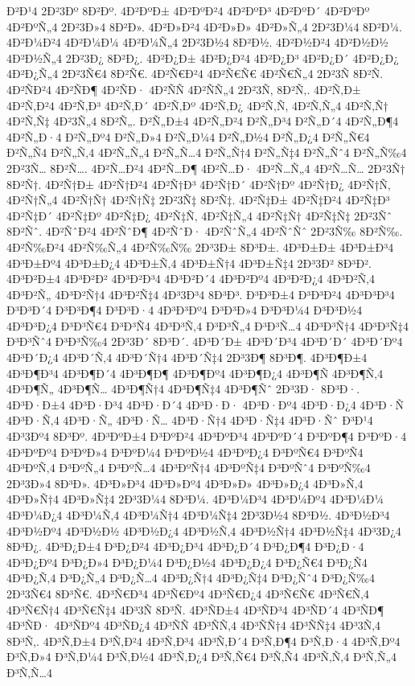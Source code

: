{Ð²Ð¹4
2Ð²3Ðº
8Ð²Ðº.
4Ð²ÐºÐ±
4Ð²ÐºÐ²4
4Ð²ÐºÐ³
4Ð²ÐºÐ´
4Ð²ÐºÐº
4Ð²ÐºÑ„4
2Ð²3Ð»4
8Ð²Ð».
4Ð²Ð»Ð²4
4Ð²Ð»Ð»
4Ð²Ð»Ñ„4
2Ð²3Ð¼4
8Ð²Ð¼.
4Ð²Ð¼Ð²4
4Ð²Ð¼Ð¼
4Ð²Ð¼Ñ„4
2Ð²3Ð½4
8Ð²Ð½.
4Ð²Ð½Ð²4
4Ð²Ð½Ð½
4Ð²Ð½Ñ„4
2Ð²3Ð¿
8Ð²Ð¿.
4Ð²Ð¿Ð±
4Ð²Ð¿Ð²4
4Ð²Ð¿Ð³
4Ð²Ð¿Ð´
4Ð²Ð¿Ð¿
4Ð²Ð¿Ñ„4
2Ð²3Ñ€4
8Ð²Ñ€.
4Ð²Ñ€Ð²4
4Ð²Ñ€Ñ€
4Ð²Ñ€Ñ„4
2Ð²3Ñ
8Ð²Ñ.
4Ð²ÑÐ²4
4Ð²ÑÐ¶
4Ð²ÑÐ·
4Ð²ÑÑ
4Ð²ÑÑ„4
2Ð²3Ñ‚
8Ð²Ñ‚.
4Ð²Ñ‚Ð±
4Ð²Ñ‚Ð²4
4Ð²Ñ‚Ð³
4Ð²Ñ‚Ð´
4Ð²Ñ‚Ðº
4Ð²Ñ‚Ð¿
4Ð²Ñ‚Ñ‚
4Ð²Ñ‚Ñ„4
4Ð²Ñ‚Ñ†
4Ð²Ñ‚Ñ‡
4Ð²3Ñ„4
8Ð²Ñ„.
Ð²Ñ„Ð±4
4Ð²Ñ„Ð²4
Ð²Ñ„Ð³4
Ð²Ñ„Ð´4
4Ð²Ñ„Ð¶4
4Ð²Ñ„Ð·4
Ð²Ñ„Ðº4
Ð²Ñ„Ð»4
Ð²Ñ„Ð¼4
Ð²Ñ„Ð½4
Ð²Ñ„Ð¿4
Ð²Ñ„Ñ€4
Ð²Ñ„Ñ4
Ð²Ñ„Ñ‚4
4Ð²Ñ„Ñ„4
Ð²Ñ„Ñ…4
Ð²Ñ„Ñ†4
Ð²Ñ„Ñ‡4
Ð²Ñ„Ñˆ4
Ð²Ñ„Ñ‰4
2Ð²3Ñ…
8Ð²Ñ….
4Ð²Ñ…Ð²4
4Ð²Ñ…Ð¶
4Ð²Ñ…Ð·
4Ð²Ñ…Ñ„4
4Ð²Ñ…Ñ…
2Ð²3Ñ†
8Ð²Ñ†.
4Ð²Ñ†Ð±
4Ð²Ñ†Ð²4
4Ð²Ñ†Ð³
4Ð²Ñ†Ð´
4Ð²Ñ†Ðº
4Ð²Ñ†Ð¿
4Ð²Ñ†Ñ‚
4Ð²Ñ†Ñ„4
4Ð²Ñ†Ñ†
4Ð²Ñ†Ñ‡
2Ð²3Ñ‡
8Ð²Ñ‡.
4Ð²Ñ‡Ð±
4Ð²Ñ‡Ð²4
4Ð²Ñ‡Ð³
4Ð²Ñ‡Ð´
4Ð²Ñ‡Ðº
4Ð²Ñ‡Ð¿
4Ð²Ñ‡Ñ‚
4Ð²Ñ‡Ñ„4
4Ð²Ñ‡Ñ†
4Ð²Ñ‡Ñ‡
2Ð²3Ñˆ
8Ð²Ñˆ.
4Ð²ÑˆÐ²4
4Ð²ÑˆÐ¶
4Ð²ÑˆÐ·
4Ð²ÑˆÑ„4
4Ð²ÑˆÑˆ
2Ð²3Ñ‰
8Ð²Ñ‰.
4Ð²Ñ‰Ð²4
4Ð²Ñ‰Ñ„4
4Ð²Ñ‰Ñ‰
2Ð³3Ð±
8Ð³Ð±.
4Ð³Ð±Ð±
4Ð³Ð±Ð³4
4Ð³Ð±Ðº4
4Ð³Ð±Ð¿4
4Ð³Ð±Ñ‚4
4Ð³Ð±Ñ†4
4Ð³Ð±Ñ‡4
2Ð³3Ð²
8Ð³Ð².
4Ð³Ð²Ð±4
4Ð³Ð²Ð²
4Ð³Ð²Ð³4
4Ð³Ð²Ð´4
4Ð³Ð²Ðº4
4Ð³Ð²Ð¿4
4Ð³Ð²Ñ‚4
4Ð³Ð²Ñ„
4Ð³Ð²Ñ†4
4Ð³Ð²Ñ‡4
4Ð³3Ð³4
8Ð³Ð³.
Ð³Ð³Ð±4
Ð³Ð³Ð²4
4Ð³Ð³Ð³4
Ð³Ð³Ð´4
Ð³Ð³Ð¶4
Ð³Ð³Ð·4
4Ð³Ð³Ðº4
Ð³Ð³Ð»4
Ð³Ð³Ð¼4
Ð³Ð³Ð½4
4Ð³Ð³Ð¿4
Ð³Ð³Ñ€4
Ð³Ð³Ñ4
4Ð³Ð³Ñ‚4
Ð³Ð³Ñ„4
Ð³Ð³Ñ…4
4Ð³Ð³Ñ†4
4Ð³Ð³Ñ‡4
Ð³Ð³Ñˆ4
Ð³Ð³Ñ‰4
2Ð³3Ð´
8Ð³Ð´.
4Ð³Ð´Ð±
4Ð³Ð´Ð³4
4Ð³Ð´Ð´
4Ð³Ð´Ðº4
4Ð³Ð´Ð¿4
4Ð³Ð´Ñ‚4
4Ð³Ð´Ñ†4
4Ð³Ð´Ñ‡4
2Ð³3Ð¶
8Ð³Ð¶.
4Ð³Ð¶Ð±4
4Ð³Ð¶Ð³4
4Ð³Ð¶Ð´4
4Ð³Ð¶Ð¶
4Ð³Ð¶Ðº4
4Ð³Ð¶Ð¿4
4Ð³Ð¶Ñ
4Ð³Ð¶Ñ‚4
4Ð³Ð¶Ñ„
4Ð³Ð¶Ñ…
4Ð³Ð¶Ñ†4
4Ð³Ð¶Ñ‡4
4Ð³Ð¶Ñˆ
2Ð³3Ð·
8Ð³Ð·.
4Ð³Ð·Ð±4
4Ð³Ð·Ð³4
4Ð³Ð·Ð´4
4Ð³Ð·Ð·
4Ð³Ð·Ðº4
4Ð³Ð·Ð¿4
4Ð³Ð·Ñ
4Ð³Ð·Ñ‚4
4Ð³Ð·Ñ„
4Ð³Ð·Ñ…
4Ð³Ð·Ñ†4
4Ð³Ð·Ñ‡4
4Ð³Ð·Ñˆ
Ð³Ð¹4
4Ð³3Ðº4
8Ð³Ðº.
4Ð³ÐºÐ±4
Ð³ÐºÐ²4
4Ð³ÐºÐ³4
4Ð³ÐºÐ´4
Ð³ÐºÐ¶4
Ð³ÐºÐ·4
4Ð³ÐºÐº4
Ð³ÐºÐ»4
Ð³ÐºÐ¼4
Ð³ÐºÐ½4
4Ð³ÐºÐ¿4
Ð³ÐºÑ€4
Ð³ÐºÑ4
4Ð³ÐºÑ‚4
Ð³ÐºÑ„4
Ð³ÐºÑ…4
4Ð³ÐºÑ†4
4Ð³ÐºÑ‡4
Ð³ÐºÑˆ4
Ð³ÐºÑ‰4
2Ð³3Ð»4
8Ð³Ð».
4Ð³Ð»Ð³4
4Ð³Ð»Ðº4
4Ð³Ð»Ð»
4Ð³Ð»Ð¿4
4Ð³Ð»Ñ‚4
4Ð³Ð»Ñ†4
4Ð³Ð»Ñ‡4
2Ð³3Ð¼4
8Ð³Ð¼.
4Ð³Ð¼Ð³4
4Ð³Ð¼Ðº4
4Ð³Ð¼Ð¼
4Ð³Ð¼Ð¿4
4Ð³Ð¼Ñ‚4
4Ð³Ð¼Ñ†4
4Ð³Ð¼Ñ‡4
2Ð³3Ð½4
8Ð³Ð½.
4Ð³Ð½Ð³4
4Ð³Ð½Ðº4
4Ð³Ð½Ð½
4Ð³Ð½Ð¿4
4Ð³Ð½Ñ‚4
4Ð³Ð½Ñ†4
4Ð³Ð½Ñ‡4
4Ð³3Ð¿4
8Ð³Ð¿.
4Ð³Ð¿Ð±4
Ð³Ð¿Ð²4
4Ð³Ð¿Ð³4
4Ð³Ð¿Ð´4
Ð³Ð¿Ð¶4
Ð³Ð¿Ð·4
4Ð³Ð¿Ðº4
Ð³Ð¿Ð»4
Ð³Ð¿Ð¼4
Ð³Ð¿Ð½4
4Ð³Ð¿Ð¿4
Ð³Ð¿Ñ€4
Ð³Ð¿Ñ4
4Ð³Ð¿Ñ‚4
Ð³Ð¿Ñ„4
Ð³Ð¿Ñ…4
4Ð³Ð¿Ñ†4
4Ð³Ð¿Ñ‡4
Ð³Ð¿Ñˆ4
Ð³Ð¿Ñ‰4
2Ð³3Ñ€4
8Ð³Ñ€.
4Ð³Ñ€Ð³4
4Ð³Ñ€Ðº4
4Ð³Ñ€Ð¿4
4Ð³Ñ€Ñ€
4Ð³Ñ€Ñ‚4
4Ð³Ñ€Ñ†4
4Ð³Ñ€Ñ‡4
4Ð³3Ñ
8Ð³Ñ.
4Ð³ÑÐ±4
4Ð³ÑÐ³4
4Ð³ÑÐ´4
4Ð³ÑÐ¶
4Ð³ÑÐ·
4Ð³ÑÐº4
4Ð³ÑÐ¿4
4Ð³ÑÑ
4Ð³ÑÑ‚4
4Ð³ÑÑ†4
4Ð³ÑÑ‡4
4Ð³3Ñ‚4
8Ð³Ñ‚.
4Ð³Ñ‚Ð±4
Ð³Ñ‚Ð²4
4Ð³Ñ‚Ð³4
4Ð³Ñ‚Ð´4
Ð³Ñ‚Ð¶4
Ð³Ñ‚Ð·4
4Ð³Ñ‚Ðº4
Ð³Ñ‚Ð»4
Ð³Ñ‚Ð¼4
Ð³Ñ‚Ð½4
4Ð³Ñ‚Ð¿4
Ð³Ñ‚Ñ€4
Ð³Ñ‚Ñ4
4Ð³Ñ‚Ñ‚4
Ð³Ñ‚Ñ„4
Ð³Ñ‚Ñ…4
}
